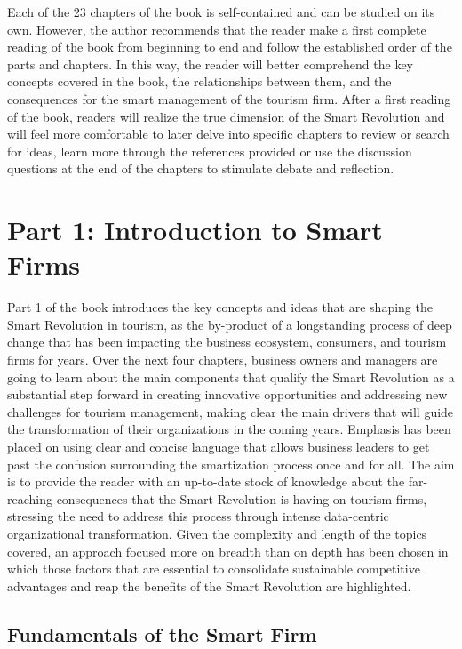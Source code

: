\documentclass[
  letterpaper,
  DIV=11,
  numbers=noendperiod]{scrreprt}
\begin{document}
Each of the 23 chapters of the book is self-contained and can be studied
on its own. However, the author recommends that the reader make a first
complete reading of the book from beginning to end and follow the
established order of the parts and chapters. In this way, the reader
will better comprehend the key concepts covered in the book, the
relationships between them, and the consequences for the smart
management of the tourism firm. After a first reading of the book,
readers will realize the true dimension of the Smart Revolution and will
feel more comfortable to later delve into specific chapters to review or
search for ideas, learn more through the references provided or use the
discussion questions at the end of the chapters to stimulate debate and
reflection.

\part{Part 1: Introduction to Smart Firms}

Part 1 of the book introduces the key concepts and ideas that are
shaping the Smart Revolution in tourism, as the by-product of a
longstanding process of deep change that has been impacting the business
ecosystem, consumers, and tourism firms for years. Over the next four
chapters, business owners and managers are going to learn about the main
components that qualify the Smart Revolution as a substantial step
forward in creating innovative opportunities and addressing new
challenges for tourism management, making clear the main drivers that
will guide the transformation of their organizations in the coming
years. Emphasis has been placed on using clear and concise language that
allows business leaders to get past the confusion surrounding the
smartization process once and for all. The aim is to provide the reader
with an up-to-date stock of knowledge about the far-reaching
consequences that the Smart Revolution is having on tourism firms,
stressing the need to address this process through intense data-centric
organizational transformation. Given the complexity and length of the
topics covered, an approach focused more on breadth than on depth has
been chosen in which those factors that are essential to consolidate
sustainable competitive advantages and reap the benefits of the Smart
Revolution are highlighted.

\hypertarget{fundamentals-of-the-smart-firm}{%
\chapter{Fundamentals of the Smart
Firm}\label{fundamentals-of-the-smart-firm}}
\end{document}
